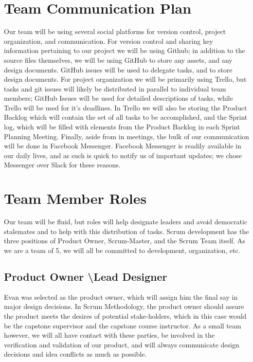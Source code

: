 \documentclass{article}
\begin{document}
\section{Team Communication Plan}
Our team will be using several social platforms for version control, project organization, and communication. For version control and sharing key information pertaining to our project we will be using Github; in addition to the source files themselves, we will be using GitHub to store any assets, and any design documents. GitHub issues will be used to delegate tasks, and to store design documents. For project organization we will be primarily using Trello, but tasks and git issues will likely be distributed in parallel to individual team members; GitHub Issues will be used for detailed descriptions of tasks, while Trello will be used for it's deadlines. In Trello we will also be storing the Product Backlog which will contain the set of all tasks to be accomplished, and the Sprint log, which will be filled with elements from the Product Backlog in each Sprint Planning Meeting. Finally, aside from in meetings, the bulk of our communication will be done in Facebook Messenger. Facebook Messenger is readily available in our daily lives, and as such is quick to notify us of important updates; we chose Messenger over Slack for these reasons. 

\section{Team Member Roles}
Our team will be fluid, but roles will help designate leaders and avoid democratic stalemates and to help with this distribution of tasks. 
Scrum development has the three positions of Product Owner, Scrum-Master, and the Scrum Team itself. As we are a team of 5, we will all be committed to development, organization, etc. 
\subsection{Product Owner \textbackslash Lead Designer}
Evan was selected as the product owner, which will assign him the final say in major design decisions. In Scrum Methodology, the product owner should assure the product meets the desires of potential stake-holders, which in this case would be the capstone supervisor and the capstone course instructor. As a small team however, we will all have contact with these parties, be involved in the verification and validation of our product, and will always communicate design decisions and idea conflicts as much as possible. 
\end{document}
